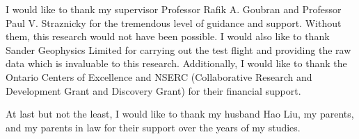 I would like to thank my supervisor Professor Rafik A. Goubran and
Professor Paul V. Straznicky for the tremendous level of guidance and
support. Without them, this research would not have been possible. I
would also like to thank Sander Geophysics Limited for carrying out
the test flight and providing the raw data which is invaluable to this
research. Additionally, I would like to thank the Ontario Centers of
Excellence and NSERC (Collaborative Research and Development Grant and
Discovery Grant) for their financial support. 

At last but not the least, I would like to thank my husband Hao Liu,
my parents, and my parents in law for their support over the years of my
studies. 
